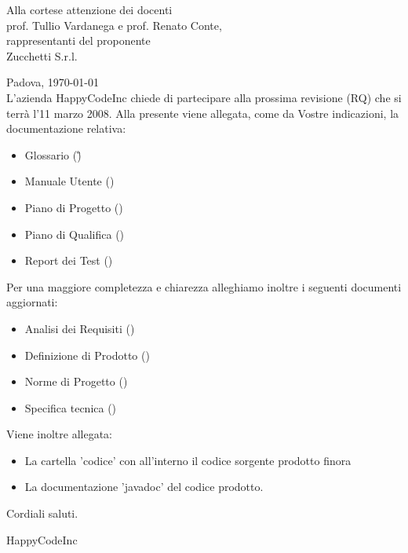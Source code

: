 


\newcommand{\dt}{ Lettera di accompagnamento }%




\thispagestyle{plain}
\begin{flushright}
Alla cortese attenzione dei docenti\\
prof. Tullio Vardanega e prof. Renato Conte,\\
rappresentanti del proponente\\
Zucchetti S.r.l.
\end{flushright}
Padova, \today \\

L'azienda HappyCodeInc chiede di partecipare alla prossima revisione (RQ) che si terr\`a l'11 marzo 2008.
Alla presente viene allegata, come da Vostre indicazioni, la documentazione relativa:
\begin{itemize}
\item{}Glossario (\G)
\item{}Manuale Utente (\MU)
\item{}Piano di Progetto (\PdP)
\item{}Piano di Qualifica (\PdQ)
\item{}Report dei Test (\TR)
\end{itemize}
Per una maggiore completezza e chiarezza alleghiamo inoltre i seguenti documenti aggiornati:
\begin{itemize}
\item{}Analisi dei Requisiti (\AR)
\item{}Definizione di Prodotto (\DdP)
\item{}Norme di Progetto (\NdP)
\item{}Specifica tecnica (\ST) 
\end{itemize}
Viene inoltre allegata:
\begin{itemize}
\item{La  cartella 'codice' con all'interno il codice sorgente prodotto finora}
\item{La documentazione 'javadoc' del codice prodotto.}
\end{itemize}

Cordiali saluti.
\begin{flushright}
HappyCodeInc
\end{flushright}
\newpage


